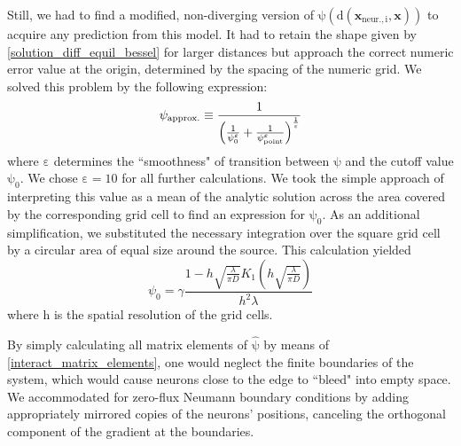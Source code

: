 \documentclass[10pt,letterpaper]{article}
\begin{document}
Still, we had to find a modified, non-diverging version of $\mathrm{\psi (d(\mathbf{x}_{\mathrm{neur.},i},\mathbf{x}))}$ to acquire any prediction from this model. It had to retain the shape given by \eqref{solution_diff_equil_bessel} for larger distances but approach the correct numeric error value at the origin, determined by the spacing of the numeric grid. We solved this problem by the following expression:
\begin{equation}
\psi_{\rm approx.} \equiv \frac{1}{\left(\frac{1}{\psi_0^\varepsilon} + \frac{1}{\psi_{\rm point}^\varepsilon}\right)^{\frac{1}{\varepsilon}}}
\label{Numeric_Solution_Expression_Trick}
\end{equation}
where $\mathrm{\varepsilon}$ determines the ``smoothness" of transition between $\mathrm{\psi}$ and the cutoff value $\mathrm{\psi_0}$. We chose $\mathrm{\varepsilon=10}$ for all further calculations. We took the simple approach of interpreting this value as a mean of the analytic solution across the area covered by the corresponding grid cell to find an expression for $\mathrm{\psi_0}$. As an additional simplification, we substituted the necessary integration over the square grid cell by a circular area of equal size around the source. This calculation yielded
\begin{equation}
\psi_0 = \gamma \frac{1-h\sqrt{\frac{\lambda}{\pi D}} K_1\left( h\sqrt{\frac{\lambda}{\pi D}}\right) }{h^2 \lambda}
\label{Numeric_Grid_Bessel_Approx}
\end{equation}
where $\mathrm{h}$ is the spatial resolution of the grid cells.

By simply calculating all matrix elements of $\mathrm{\hat{\psi}}$ by means of \eqref{interact_matrix_elements}, one would neglect the finite boundaries of the system, which would cause neurons close to the edge to ``bleed" into empty space. We accommodated for zero-flux Neumann boundary conditions by adding appropriately mirrored copies of the neurons' positions, canceling the orthogonal component of the gradient at the boundaries. 
\end{document}
